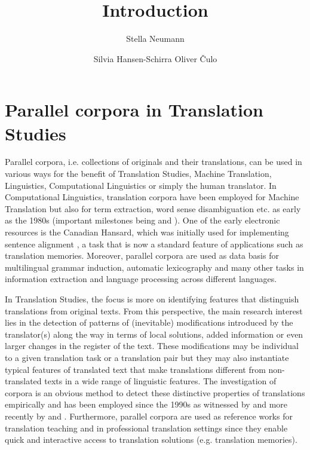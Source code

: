 \documentclass[output=paper]{LSP/langsci}
\author{Stella Neumann\affiliation{IFAAR, RWTH Aachen}\and
 Silvia Hansen-Schirra\lastand 
Oliver Čulo\affiliation{Universität Mainz, Germersheim}
}
\title{Introduction}
\begin{document}
\section{Parallel corpora in Translation Studies}

Parallel corpora, i.e. collections of originals and their translations, can be used in various ways for the benefit of Translation Studies, Machine Translation, Linguistics, Computational Linguistics or simply the human translator. 
In Computational Linguistics, translation corpora have been employed for Machine Translation but also for term extraction, word sense disambiguation etc. as early as the 1980s (important milestones being  \citealt{Nagao1984} and \citealt{Brown1990}). One of the early electronic resources is the Canadian Hansard, which was initially used for implementing sentence alignment \citep{Gale1991}, a task that is now a standard feature of applications such as translation memories. Moreover, parallel corpora are used as data basis for multilingual grammar induction, automatic lexicography and many other tasks in information extraction and language processing across different languages.

In Translation Studies, the focus is more on identifying features that distinguish translations from original texts. From this perspective, the main research interest lies in the detection of patterns of (inevitable) modifications introduced by the translator(s) along the way in terms of local solutions, added information or even larger changes in the register of the text. These modifications may be individual to a given translation task or a translation pair but they may also instantiate typical features of translated text that make translations different from non-translated texts in a wide range of linguistic features. The investigation of corpora is an obvious method to detect these distinctive properties of translations empirically and has been employed since the 1990s as witnessed by \citet{Baker1993,Baker1996,Johansson1996} and more recently by  \citet{Hansen2003,Teich2003,Mauranen2004} and \citet{Hansen-Schirra2012}. Furthermore, parallel corpora are used as reference works for translation teaching and in professional translation settings since they enable quick and interactive access to translation solutions (e.g. translation memories).
 
\end{document}
